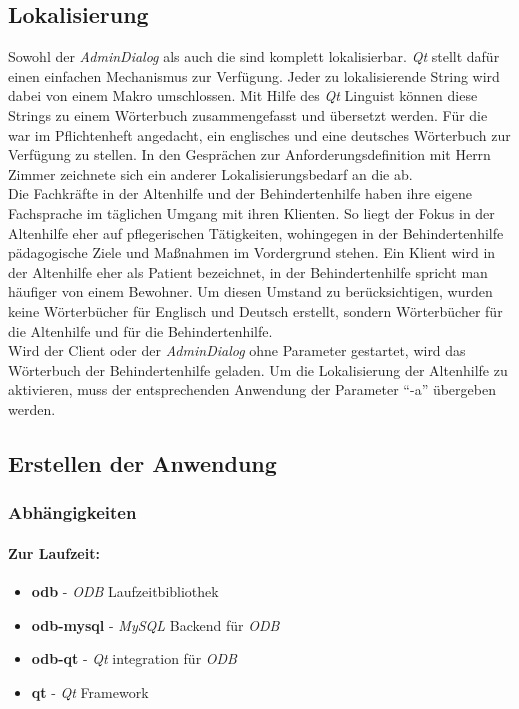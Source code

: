 \subsection{Lokalisierung}
Sowohl der \textit{AdminDialog} als auch die \EBP sind komplett lokalisierbar. \textit{Qt} stellt dafür einen einfachen Mechanismus zur Verfügung. Jeder zu
lokalisierende String wird dabei von einem Makro umschlossen. Mit Hilfe des \textit{Qt} Linguist können diese Strings zu einem Wörterbuch zusammengefasst und
übersetzt werden. Für die \EBP war im Pflichtenheft angedacht, ein englisches und eine deutsches Wörterbuch zur Verfügung zu stellen. In den
Gesprächen zur Anforderungsdefinition mit Herrn Zimmer zeichnete sich ein anderer Lokalisierungsbedarf an die \EBP ab.\\
Die Fachkräfte in der Altenhilfe und der Behindertenhilfe haben ihre eigene Fachsprache im täglichen Umgang mit ihren Klienten. So liegt der Fokus in
der Altenhilfe eher auf pflegerischen Tätigkeiten, wohingegen in der Behindertenhilfe pädagogische Ziele und Maßnahmen im Vordergrund stehen. Ein
Klient wird in der Altenhilfe eher als Patient bezeichnet, in der Behindertenhilfe spricht man häufiger von einem Bewohner. Um diesen Umstand zu
berücksichtigen, wurden keine Wörterbücher für Englisch und Deutsch erstellt, sondern Wörterbücher für die Altenhilfe und für die Behindertenhilfe.\\
Wird der Client oder der \textit{AdminDialog} ohne Parameter gestartet, wird das Wörterbuch der Behindertenhilfe geladen. Um die Lokalisierung der Altenhilfe
zu aktivieren, muss der entsprechenden Anwendung der Parameter ``-a'' übergeben werden.


\subsection{Erstellen der Anwendung}
\subsubsection{Abhängigkeiten}
\paragraph{Zur Laufzeit:}
\begin{itemize}
	\item \textbf{odb} - \textit{ODB} Laufzeitbibliothek
	\item \textbf{odb-mysql} - \textit{MySQL} Backend für \textit{ODB}
	\item \textbf{odb-qt} - \textit{Qt} integration für \textit{ODB}
	\item \textbf{qt} - \textit{Qt} Framework
\end{itemize}
